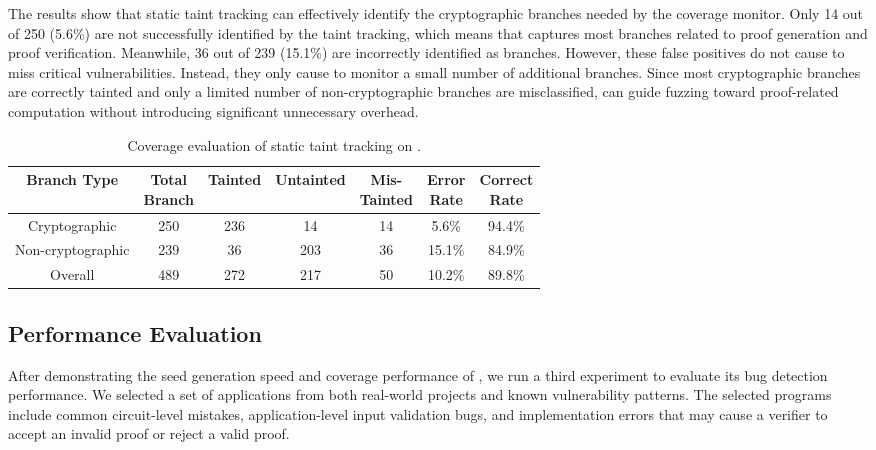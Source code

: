 The results show that static taint tracking can effectively identify the cryptographic branches needed by the coverage monitor. Only 14 out of 250  (5.6\%) are not successfully identified by the taint tracking, which means that \greyboxfuzz captures most branches related to proof generation and proof verification. Meanwhile, 36 out of 239  (15.1\%) are incorrectly identified as \cryptobranch branches. However, these false positives do not cause \greyboxfuzz to miss critical vulnerabilities. Instead, they only cause \greyboxfuzz to monitor a small number of additional branches. Since most cryptographic branches are correctly tainted and only a limited number of non-cryptographic branches are misclassified, \greyboxfuzz can guide fuzzing toward proof-related computation without introducing significant unnecessary overhead.



\begin{table}[!t]
\caption{Coverage evaluation of static taint tracking on \rapidsnark.}
\label{tab:coverage_performance}
\vspace*{6pt}
\centering
\renewcommand{\arraystretch}{1.15}
\begin{tabular}{c||c|ccc|cc}
\hline
Branch Type & \makecell{Total \\Branch} & Tainted & Untainted & \makecell{Mis-\\Tainted} & \makecell{Error \\Rate} & \makecell{Correct \\Rate} \\
\hline
\hline
Cryptographic & 250 & 236 & 14 & 14 & 5.6\% & 94.4\% \\
\hline
Non-cryptographic & 239 & 36 & 203 & 36 & 15.1\% & 84.9\% \\
\hline
Overall & 489 & 272 & 217 & 50 & 10.2\% & 89.8\% \\
\hline
\end{tabular}
\end{table}



\subsection{Performance Evaluation}

After demonstrating the seed generation speed and coverage performance of \greyboxfuzz, we run a third experiment to evaluate its bug detection performance. We selected a set of \zksnark applications from both real-world projects and known vulnerability patterns. The selected programs include common circuit-level mistakes, application-level input validation bugs, and implementation errors that may cause a verifier to accept an invalid proof or reject a valid proof.

